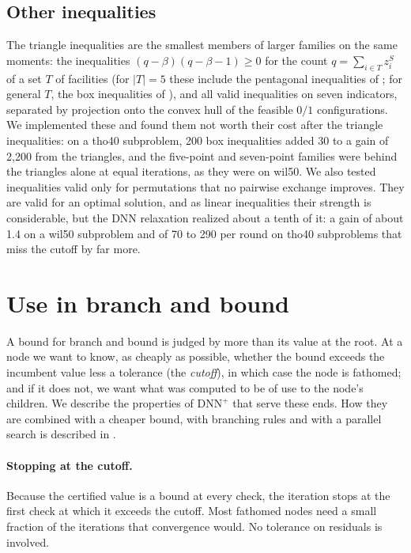 \documentclass[11pt]{article}
\theoremstyle{remark}
\newcommand{\DNNp}{\mathrm{DNN}^{+}}
\begin{document}
\subsection{Other inequalities}\label{sec:other}

The triangle inequalities are the smallest members of larger families on the
same moments: the inequalities $(q-\beta)(q-\beta-1)\ge0$ for the count
$q = \sum_{i\in T}z_i^S$ of a set $T$ of facilities (for $|T|=5$ these include the
pentagonal inequalities of \cite{padberg}; for general $T$, the box inequalities
of \cite{jk}), and all valid inequalities on seven indicators, separated by
projection onto the convex hull of the feasible $0/1$ configurations. We
implemented these and found them not worth their cost after the triangle
inequalities: on a tho40 subproblem, 200 box inequalities added 30 to a gain of
2,200 from the triangles, and the five-point and seven-point families were
behind the triangles alone at equal iterations, as they were on wil50. We also
tested inequalities valid only for permutations that no pairwise exchange
improves. They are valid for an optimal solution, and as linear inequalities
their strength is considerable, but the DNN relaxation realized about a tenth of
it: a gain of about 1.4 on a wil50 subproblem and of 70 to 290 per round on
tho40 subproblems that miss the cutoff by far more.


\section{Use in branch and bound}\label{sec:bnb}

A bound for branch and bound is judged by more than its value at the root. At a
node we want to know, as cheaply as possible, whether the bound exceeds the
incumbent value less a tolerance (the \emph{cutoff}), in which case the node is
fathomed; and if it does not, we want what was computed to be of use to the
node's children. We describe the properties of $\DNNp$ that serve these ends.
How they are combined with a cheaper bound, with branching rules and with a
parallel search is described in \cite{companion}.

\paragraph{Stopping at the cutoff.} Because the certified value is a bound at
every check, the iteration stops at the first check at which it exceeds the
cutoff. Most fathomed nodes need a small fraction of the iterations that
convergence would. No tolerance on residuals is involved.
\end{document}
